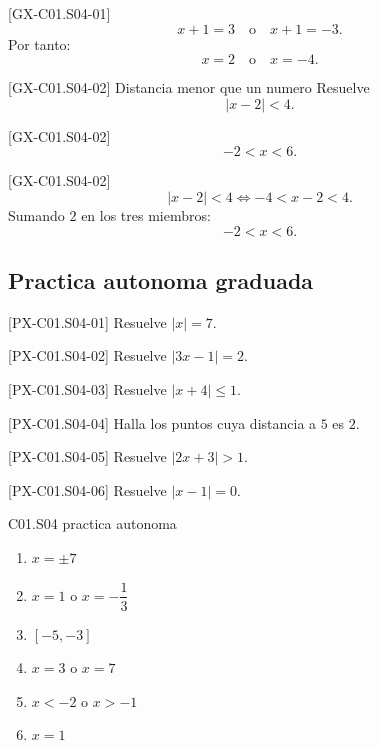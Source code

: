 \begin{fullsolution}{[GX-C01.S04-01]}
\[
x+1=3 \quad \text{o} \quad x+1=-3.
\]
Por tanto:
\[
x=2 \quad \text{o} \quad x=-4.
\]
\end{fullsolution}

\begin{guidedexercise}{[GX-C01.S04-02] Distancia menor que un numero}
Resuelve
\[
|x-2|<4.
\]
\end{guidedexercise}

\begin{shortanswer}{[GX-C01.S04-02]}
\[
-2<x<6.
\]
\end{shortanswer}

\begin{fullsolution}{[GX-C01.S04-02]}
\[
|x-2|<4 \Longleftrightarrow -4<x-2<4.
\]
Sumando \(2\) en los tres miembros:
\[
-2<x<6.
\]
\end{fullsolution}

\subsection*{Practica autonoma graduada}
\begin{exercise}{[PX-C01.S04-01] Resuelve \(|x|=7\).}
\end{exercise}
\begin{exercise}{[PX-C01.S04-02] Resuelve \(|3x-1|=2\).}
\end{exercise}
\begin{exercise}{[PX-C01.S04-03] Resuelve \(|x+4|\le 1\).}
\end{exercise}
\begin{exercise}{[PX-C01.S04-04] Halla los puntos cuya distancia a \(5\) es \(2\).}
\end{exercise}
\begin{exercise}{[PX-C01.S04-05] Resuelve \(|2x+3|>1\).}
\end{exercise}
\begin{exercise}{[PX-C01.S04-06] Resuelve \(|x-1|=0\).}
\end{exercise}

\begin{shortanswer}{C01.S04 practica autonoma}
\begin{enumerate}[label=\textbf{PX-C01.S04-\arabic*:}, leftmargin=*]
  \item \(x=\pm 7\)
  \item \(x=1\) o \(x=-\dfrac{1}{3}\)
  \item \([-5,-3]\)
  \item \(x=3\) o \(x=7\)
  \item \(x<-2\) o \(x>-1\)
  \item \(x=1\)
\end{enumerate}
\end{shortanswer}

